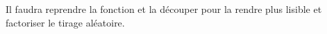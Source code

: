 
\begin{DoxyRefList}
\item[Member \mbox{\hyperlink{classAfficher_a7c4514f663d308c7d35ee7bae1cc7225}{Afficher\+::Deroulement\+Joueur\+IA}} (\mbox{\hyperlink{classJoueurIA}{Joueur\+IA}} \&joueur\+\_\+qui\+\_\+joue, \mbox{\hyperlink{classJoueurReel}{Joueur\+Reel}} \&adversaire)]\label{todo__todo000001}%
%
Il faudra reprendre la fonction et la découper pour la rendre plus lisible et factoriser le tirage aléatoire. 
\end{DoxyRefList}